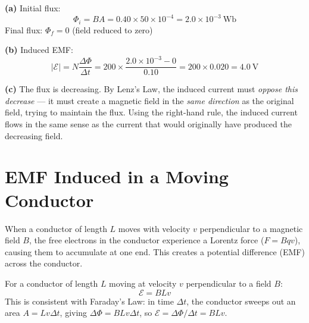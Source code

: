 \begin{solutionbox}
\textbf{(a)} Initial flux:
\[
  \Phi_i = BA = 0.40 \times 50\times10^{-4}
  = 2.0\times10^{-3}\ \text{Wb}
\]
Final flux: $\Phi_f = 0$ (field reduced to zero)

\textbf{(b)} Induced EMF:
\[
  |\mathcal{E}| = N\frac{\Delta\Phi}{\Delta t}
  = 200 \times \frac{2.0\times10^{-3} - 0}{0.10}
  = 200 \times 0.020 = 4.0\ \text{V}
\]

\textbf{(c)} The flux is decreasing. By Lenz's Law,
the induced current must \textit{oppose this decrease}
--- it must create a magnetic field in the \textit{same
direction} as the original field, trying to maintain
the flux. Using the right-hand rule, the induced
current flows in the same sense as the current that
would originally have produced the decreasing field.
\end{solutionbox}

\section{EMF Induced in a Moving Conductor}

When a conductor of length $L$ moves with velocity $v$
perpendicular to a magnetic field $B$, the free
electrons in the conductor experience a Lorentz force
($F = Bqv$), causing them to accumulate at one end.
This creates a potential difference (EMF) across the
conductor.

\begin{lawbox}
For a conductor of length $L$ moving at velocity $v$
perpendicular to a field $B$:
\[
  \mathcal{E} = BLv
\]
This is consistent with Faraday's Law: in time $\Delta t$,
the conductor sweeps out an area $A = Lv\Delta t$,
giving $\Delta\Phi = BLv\Delta t$, so
$\mathcal{E} = \Delta\Phi/\Delta t = BLv$.
\end{lawbox}

